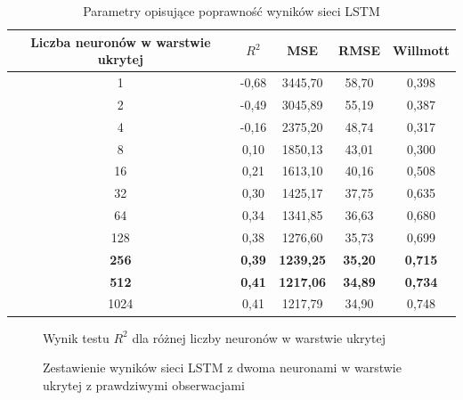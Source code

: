 \documentclass[10pt,a4paper]{article}
\begin{document}
\begin{table}[h!]
	\centering
	\begin{tabular}{|c|c|c|c|c|}
		\hline
		Liczba neuronów w warstwie ukrytej & $R^2$ & MSE & RMSE & Willmott \\
		\hline
		1    & -0,68 & 3445,70 & 58,70 & 0,398 \\
		2    & -0,49 & 3045,89 & 55,19 & 0,387 \\
		4    & -0,16 & 2375,20 & 48,74 & 0,317 \\
		8    & 0,10  & 1850,13 & 43,01 & 0,300 \\
		16   & 0,21  & 1613,10 & 40,16 & 0,508 \\
		32   & 0,30  & 1425,17 & 37,75 & 0,635 \\
		64   & 0,34  & 1341,85 & 36,63 & 0,680 \\
		128  & 0,38  & 1276,60 & 35,73 & 0,699 \\
		\textbf{256}  & \textbf{0,39}  & \textbf{1239,25} & \textbf{35,20} & \textbf{0,715} \\
		\textbf{512}  & \textbf{0,41}  & \textbf{1217,06} & \textbf{34,89} & \textbf{0,734} \\
		1024 & 0,41  & 1217,79 & 34,90 & 0,748 \\
		\hline
	\end{tabular}
	\caption{Parametry opisujące poprawność wyników sieci LSTM}
	\label{table:lstm}
\end{table}
\begin{figure}[!ht]
	\centering
	\caption{Wynik testu $R^2$ dla różnej liczby neuronów w warstwie ukrytej}
	\label{figure:lstm_neurons}
\end{figure}
\FloatBarrier
\begin{figure}[!ht]
	\centering
	\caption{Zestawienie wyników sieci LSTM z dwoma neuronami w warstwie ukrytej z prawdziwymi obserwacjami}
	\label{figure:lstm_2}
\end{figure}
\end{document}
